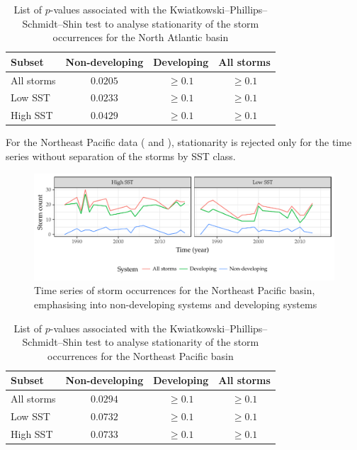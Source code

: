 \begin{table}[H]
	\centering
	\begin{tabular}{lccc}
		\toprule
		\toprule
		Subset     & Non-developing & Developing & All storms \\
		\midrule
		All storms &  $0.0205$      & $\geq 0.1$ & $\geq 0.1$ \\
		Low SST    &  $0.0233$      & $\geq 0.1$ & $\geq 0.1$ \\
		High SST   &  $0.0429$      & $\geq 0.1$ & $\geq 0.1$ \\
		\bottomrule
		\bottomrule
	\end{tabular}
	\caption{List of $p$-values associated with the Kwiatkowski--Phillips--Schmidt--Shin test to analyse stationarity of the storm occurrences for the North Atlantic basin}
	\label{tab:natl-storms-ts-stationarity}
\end{table}

For the Northeast Pacific data ( and ), stationarity is rejected only for the time series without separation of the storms by SST class.

\begin{figure}[H]
	\centering
	\includegraphics[width=\textwidth]{images/epac-storms-ts}
	\caption{Time series of storm occurrences for the Northeast Pacific basin, emphasising into non-developing systems and developing systems}
	\label{fig:epac-storms-ts}
\end{figure}

\begin{table}[H]
	\centering
	\begin{tabular}{lccc}
		\toprule
		\toprule
		Subset     & Non-developing & Developing & All storms \\
		\midrule
		All storms &  $0.0294$      & $\geq 0.1$ & $\geq 0.1$ \\
		Low SST    &  $0.0732$      & $\geq 0.1$ & $\geq 0.1$ \\
		High SST   &  $0.0733$      & $\geq 0.1$ & $\geq 0.1$ \\
		\bottomrule
		\bottomrule
	\end{tabular}
	\caption{List of $p$-values associated with the Kwiatkowski--Phillips--Schmidt--Shin test to analyse stationarity of the storm occurrences for the Northeast Pacific basin}
	\label{tab:epac-storms-ts-stationarity}
\end{table}

